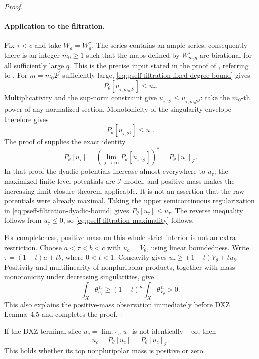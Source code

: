 \begin{proof}
\paragraph{Application to the filtration.}

Fix \(\tau<c\) and take \(W_a=W_a^\tau\).
The series contains an ample series; consequently there is an integer
\(m_0\geq1\) such that the maps defined by \(W_{m_0q}^\tau\) are birational
for all sufficiently large \(q\).
This is the precise input stated in the proof of
\cite[Proposition~4.6]{DXZ23}, referring to \cite[Lemma~1.6]{BC11}.
For \(m=m_0 2^j\) sufficiently large,
\eqref{eq:pseff-filtration-fixed-degree-bound} gives
\[
                    P_\theta[u_{\tau,m_0 2^j}]\leq u_\tau.
\]
Multiplicativity and the sup-norm constraint give
\(u_{\tau,2^j}\leq u_{\tau,m_0 2^j}\): take the \(m_0\)-th power of any
normalized section.  Monotonicity of the singularity envelope therefore
gives
\[
\tag{71.48l}\label{eq:pseff-filtration-dyadic-bound}
                         P_\theta[u_{\tau,2^j}]\leq u_\tau.
\]
The proof of \cite[Lemma~4.5]{DXZ23} supplies the exact identity
\[
 P_\theta[u_\tau]
      =\left(\lim_{j\to\infty}P_\theta[u_{\tau,2^j}]\right)^*
      =P_\theta[u_\tau]_{\mathcal I}.
\]
In that proof the dyadic potentials increase almost everywhere to
\(u_\tau\); the maximized finite-level potentials are \(\mathcal I\)-model,
and positive mass makes the increasing-limit closure theorem applicable.
It is not an assertion that the raw potentials were already maximal.
Taking the upper semicontinuous regularization in
\eqref{eq:pseff-filtration-dyadic-bound} gives \(P_\theta[u_\tau]\leq u_\tau\).
The reverse inequality follows from \(u_\tau\leq0\), so
\eqref{eq:pseff-filtration-maximality} follows.

For completeness, positive mass on this whole strict interior is not an
extra restriction.  Choose \(a<\tau<b<c\) with \(u_a=V_\theta\), using
linear boundedness.  Write \(\tau=(1-t)a+tb\), where \(0<t<1\).
Concavity gives
\(u_\tau\geq(1-t)V_\theta+t u_b\).
Positivity and multilinearity of nonpluripolar products, together with
mass monotonicity under decreasing singularities, give
\[
       \int_X\theta_{u_\tau}^{\,n}
                    \geq(1-t)^n\int_X\theta_{V_\theta}^{\,n}>0.
\]
This also explains the positive-mass observation immediately before
DXZ Lemma~4.5 and completes the proof.
\end{proof}

\begin{corollary}\label{cor:pseff-terminal-filtration-slice}
If the DXZ terminal slice
\(u_c=\lim_{\tau\uparrow c}u_\tau\) is not identically \(-\infty\), then
\[
                 u_c=P_\theta[u_c]=P_\theta[u_c]_{\mathcal I}.
\]
This holds whether its top nonpluripolar mass is positive or zero.
\end{corollary}

